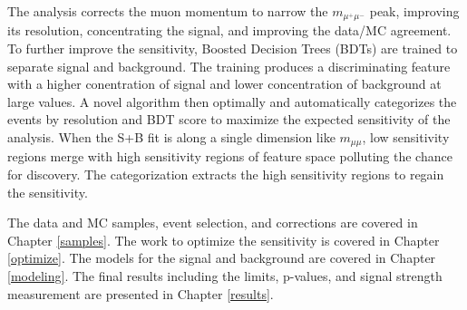 The analysis corrects the muon momentum to narrow the $m_{\mu^+\mu^-}$ peak, improving its resolution, concentrating the signal, and improving the data/MC agreement. To further improve the sensitivity, Boosted Decision Trees (BDTs) \cite{bdt} are trained to separate signal and background. The training produces a discriminating feature with a higher conentration of signal and lower concentration of background at large values. A novel algorithm then optimally and automatically categorizes the events by resolution and BDT score to maximize the expected sensitivity of the analysis. When the S+B fit is along a single dimension like $m_{\mu\mu}$, low sensitivity regions merge with high sensitivity regions of feature space polluting the chance for discovery. The categorization extracts the high sensitivity regions to regain the sensitivity. 

The data and MC samples, event selection, and corrections are covered in Chapter \ref{samples}. The work to optimize the sensitivity is covered in Chapter \ref{optimize}. The models for the signal and background are covered in Chapter \ref{modeling}. The final results including the limits, p-values, and signal strength measurement are presented in Chapter \ref{results}.
